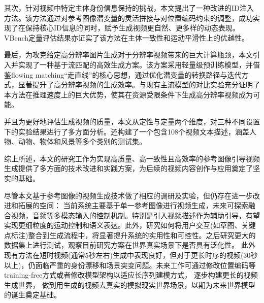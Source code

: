 其次，针对视频中特定主体身份信息保持的挑战，本文提出了一种改进的ID注入方法。该方法通过对参考图像潜变量的灵活拼接与对位置编码约束的调整，成功实现了在保持核心ID信息的同时，赋予生成视频更自然、更多样的动态表现。VBench定量评估结果亦证实了该方法在主体一致性和运动平滑性上的优越性。

最后，为攻克给定高分辨率图片生成对于分辨率视频带来的巨大计算瓶颈，本文引入并实现了一种基于流匹配的高效生成方案。该方案采用轻量级预训练模型，并借鉴flowing matching“走直线”的核心思想，通过优化潜变量的转换路径与迭代方式，显著提升了高分辨率视频的生成效率。与现有主流模型的对比实验充分证明了本方法在推理速度上的巨大优势，使其在资源受限条件下生成高分辨率视频成为可能。

并且为更好地评估生成视频的质量，本文从定性与定量两个维度，对三种不同设置下的实验结果进行了多方面分析。还构建了一个包含108个视频文本描述，涵盖人物、动物、物体和风景等多个类别的测试集。


综上所述，本文的研究工作为实现高质量、高一致性且高效率的参考图像引导视频生成提供了多方面的技术改进和实践方案，为后续的视频内容创作与应用奠定了坚实的基础。

尽管本文基于参考图像的视频生成技术做了相应的调研及实验，但仍存在进一步改进和拓展的空间：
当前系统主要基于单一参考图像进行视频生成，未来可探索融合视频，音频等多模态输入的控制机制。特别是引入视频描述作为辅助引导，有望实现更细粒度的运动控制和语义表达。此外，研究如何将用户交互(如草图、关键点标注)整合到生成流程中，将显著提升系统的实用性和可控性。之后研究更大的数据集上进行测试，观察目前研究方案在世界真实场景下是否具有泛化性。
此外现有方法在短时视频(通常5秒左右)生成中表现良好，但对于更长时序的视频(30秒以上)，仍面临严重的身份漂移和场景突变问题。未来工作可通过修改位置编码等training-free方式或者修改模型架构以适应长序列建模方式， 逐步构建更长的视频生成世界， 做到用生成的视频去真实的模拟现实世界场景，以期为未来世界模型的诞生奠定基础。
